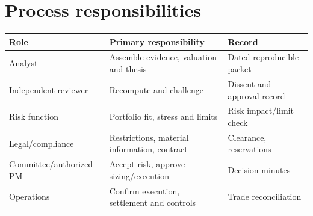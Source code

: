 \documentclass[11pt,letterpaper]{article}
\begin{document}
\section{Process responsibilities}
\begin{center}\small\begin{tabularx}{\textwidth}{>{\raggedright\arraybackslash}p{}>{\raggedright\arraybackslash}X >{\raggedright\arraybackslash}X}\toprule Role & Primary responsibility & Record \\
\midrule Analyst & Assemble evidence, valuation and thesis & Dated reproducible packet \\
Independent reviewer & Recompute and challenge & Dissent and approval record \\
Risk function & Portfolio fit, stress and limits & Risk impact/limit check \\
Legal/compliance & Restrictions, material information, contract & Clearance, reservations \\
Committee/authorized PM & Accept risk, approve sizing/execution & Decision minutes \\
Operations & Confirm execution, settlement and controls & Trade reconciliation \\
\bottomrule\end{tabularx}\end{center}
\end{document}
